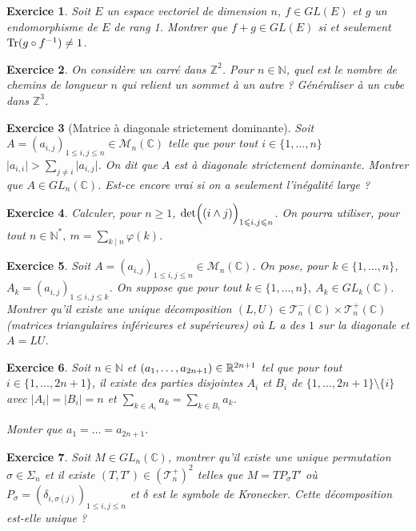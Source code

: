 \documentclass[12pt]{article}
\newtheorem{exercise}{Exercice}[section]
\theoremstyle{remark}
\theoremstyle{remark}
\newcommand{\C}{\mathbb{C}} \newcommand{\Q}{\mathbb{Q}}
\newcommand{\N}{\mathbb{N}} \newcommand{\Z}{\mathbb{Z}}
\newcommand{\M}{\mathcal{M}} \renewcommand{\L}{\mathcal{L}}
\begin{document}
\begin{exercise}
	Soit $E$ un espace vectoriel de dimension $n$, $f\in GL(E)$ et $g$ un
	endomorphisme de $E$ de rang 1. Montrer que $f+g\in GL(E)$ si et seulement
	$\operatorname{Tr}(g\circ f^{-1})\neq 1$.
\end{exercise}

\begin{exercise}
	On considère un carré dans $\Z^{2}$. Pour $n\in\N$, quel est le nombre de
	chemins de longueur $n$ qui relient un sommet à un autre ? Généraliser à un
	cube dans $\Z^{3}$.
\end{exercise}

\begin{exercise}[Matrice à diagonale strictement dominante]
	Soit $A=(a_{i,j})_{1\leqslant i,j\leqslant n}\in\M_{n}(\C)$ telle que pour
	tout $i\in\{1,\dots,n\}$$\vert a_{i,i}\vert>\sum_{j\neq i}\vert a_{i,j}\vert$.
	On dit que $A$ est à diagonale strictement dominante. Montrer que $A\in
	GL_{n}(\C)$. Est-ce encore vrai si on a seulement l'inégalité large ?
\end{exercise}

\begin{exercise}
	Calculer, pour $n\geqslant1$, $\det\Bigl((i\wedge j)\Bigr)_{1\leqslant
	i,j\leqslant n}$. On pourra utiliser, pour tout $n\in\N^{*},~m=\sum_{k\mid
	n}\varphi(k)$.
\end{exercise}

\begin{exercise}
	Soit $A=(a_{i,j})_{1\leqslant i,j\leqslant n}\in\M_{n}(\C)$. On pose, pour
	$k\in\{1,\dots, n\}$,$A_{k}=(a_{i,j})_{1\leqslant i,j\leqslant k}$. On suppose
	que pour tout $k\in\{1,\dots,n\},~A_{k}\in GL_{k}(\C)$. Montrer qu'il existe
	une unique décomposition
	$(L,U)\in\mathcal{T}_{n}^{-}(\C)\times\mathcal{T}_{n}^{+}(\C)$ (matrices
	triangulaires inférieures et supérieures) où $L$ a des $1$ sur la diagonale et
	$A=LU$.
\end{exercise}

\begin{exercise}
	Soit $n\in\N$ et $(a_{1},\dots,a_{2n+1})\in\mathbb{R}^{2n+1}$ tel que pour tout
	$i\in\{1,\dots,2n+1\}$, il existe des parties disjointes $A_{i}$ et $B_{i}$ de
	$\{1,\dots,2n+1\}\setminus\{i\}$ avec $\vert A_{i}\vert=\vert B_{i}\vert=n$ et
	$\sum_{k\in A_{i}}a_{k}=\sum_{k\in B_{i}}a_{k}$.

	Monter que $a_{1}=\dots=a_{2n+1}$.
\end{exercise}

\begin{exercise}
	Soit $M\in GL_{n}(\C)$, montrer qu'il existe une unique permutation
	$\sigma\in\Sigma_{n}$ et il existe $(T,T')\in(\mathcal{T}_{n}^{+})^{2}$ telles
	que $M=TP_{\sigma}T'$ où $P_{\sigma}=(\delta_{i,\sigma(j)})_{1\leqslant
	i,j\leqslant n}$ et $\delta$ est le symbole de Kronecker. Cette décomposition
	est-elle unique ?
\end{exercise}
\end{document}
